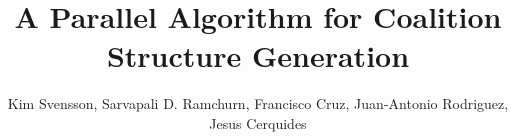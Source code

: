 \documentclass{llncs}
\begin{document}


\title{A Parallel Algorithm for Coalition Structure Generation}




%
%
%
%

%


%
\author{Kim Svensson, Sarvapali D. Ramchurn, Francisco Cruz, Juan-Antonio Rodriguez, Jesus Cerquides}
\end{document}
